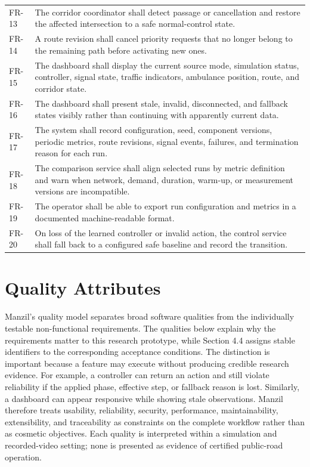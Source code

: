 \begin{longtable}{p{}p{}}
FR-13 & The corridor coordinator shall detect passage or cancellation and restore the affected intersection to a safe normal-control state.\\
FR-14 & A route revision shall cancel priority requests that no longer belong to the remaining path before activating new ones.\\
FR-15 & The dashboard shall display the current source mode, simulation status, controller, signal state, traffic indicators, ambulance position, route, and corridor state.\\
FR-16 & The dashboard shall present stale, invalid, disconnected, and fallback states visibly rather than continuing with apparently current data.\\
FR-17 & The system shall record configuration, seed, component versions, periodic metrics, route revisions, signal events, failures, and termination reason for each run.\\
FR-18 & The comparison service shall align selected runs by metric definition and warn when network, demand, duration, warm-up, or measurement versions are incompatible.\\
FR-19 & The operator shall be able to export run configuration and metrics in a documented machine-readable format.\\
FR-20 & On loss of the learned controller or invalid action, the control service shall fall back to a configured safe baseline and record the transition.\\
\bottomrule
\end{longtable}

\section{Quality Attributes}

Manzil's quality model separates broad software qualities from the individually testable non-functional requirements. The qualities below explain why the requirements matter to this research prototype, while Section 4.4 assigns stable identifiers to the corresponding acceptance conditions. The distinction is important because a feature may execute without producing credible research evidence. For example, a controller can return an action and still violate reliability if the applied phase, effective step, or fallback reason is lost. Similarly, a dashboard can appear responsive while showing stale observations. Manzil therefore treats usability, reliability, security, performance, maintainability, extensibility, and traceability as constraints on the complete workflow rather than as cosmetic objectives. Each quality is interpreted within a simulation and recorded-video setting; none is presented as evidence of certified public-road operation.

